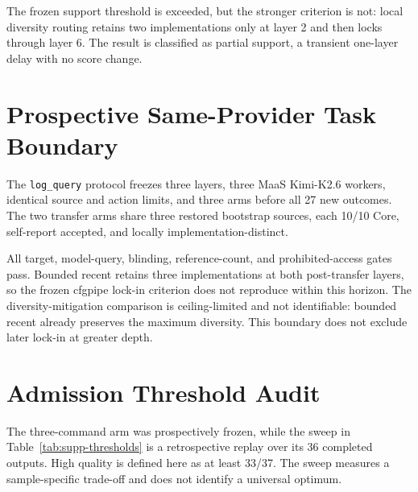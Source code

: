 \documentclass[letterpaper]{article}
\begin{document}
The frozen support threshold is exceeded, but the stronger criterion is not:
local diversity routing retains two implementations only at layer 2 and then
locks through layer 6. The result is classified as partial support, a transient
one-layer delay with no score change.

\section{Prospective Same-Provider Task Boundary}

The \texttt{log\_query} protocol freezes three layers, three MaaS Kimi-K2.6
workers, identical source and action limits, and three arms before all 27 new
outcomes. The two transfer arms share three restored bootstrap sources, each
10/10 Core, self-report accepted, and locally implementation-distinct.

\begin{table}[t]
\centering
\caption{Prospective \texttt{log\_query} boundary. Diversity AUC is the sum of
unique primary implementations over layers 2--3; the maximum is 6.}
\label{tab:supp-log-query}
\small
{}
\end{table}

All target, model-query, blinding, reference-count, and prohibited-access gates
pass. Bounded recent retains three implementations at both post-transfer layers,
so the frozen cfgpipe lock-in criterion does not reproduce within this horizon.
The diversity-mitigation comparison is ceiling-limited and not identifiable:
bounded recent already preserves the maximum diversity. This boundary does not
exclude later lock-in at greater depth.

\section{Admission Threshold Audit}

The three-command arm was prospectively frozen, while the sweep in
Table~\ref{tab:supp-thresholds} is a retrospective replay over its 36 completed
outputs. High quality is defined here as at least 33/37. The sweep measures a
sample-specific trade-off and does not identify a universal optimum.
\end{document}
